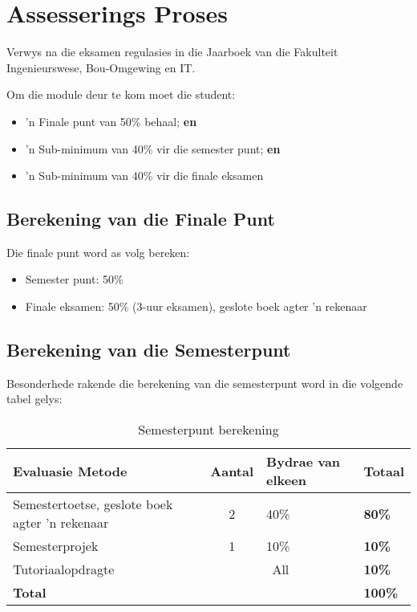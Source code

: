 \section{Assesserings Proses}
Verwys na die eksamen regulasies in die Jaarboek van die Fakulteit
Ingenieurswese, Bou-Omgewing en IT.

Om die module deur te kom moet die student:
    \begin{itemize}
        \item 'n Finale punt van 50\% behaal; {\bf en}
        \item 'n Sub-minimum van 40\% vir die semester punt; {\bf en}
        \item 'n Sub-minimum van 40\% vir die finale eksamen
    \end{itemize}
    
    \subsection{Berekening van die Finale Punt}
        Die finale punt word as volg bereken:
        \begin{itemize}
            \item Semester punt: 50\%
            \item Finale eksamen: 50\% (3-uur eksamen), geslote boek
              agter 'n rekenaar
        \end{itemize}

    \subsection{Berekening van die Semesterpunt}
    Besonderhede rakende die berekening van die semesterpunt word in
    die volgende tabel gelys:
        \begin{table}[!h]
            \begin{center}
             \begin{tabular}{|p{5cm}|c|l|l|}
               \hline
               {\bf Evaluasie Metode} & {\bf Aantal} & 
               {\bf Bydrae van elkeen} & {\bf Totaal} \\
               \hline
               Semestertoetse, geslote boek
               agter 'n rekenaar
               & 2 & 40\% & {\bf 80\%} \\ \hline
               Semesterprojek
               & 1 & 10\% & {\bf 10\%} \\ \hline
               Tutoriaalopdragte
               & \multicolumn{2}{|c|}{All} & {\bf 10\%} \\
               \hline
               \multicolumn{3}{|l|}{{\bf Total}} & {\bf 100\%} \\
               \hline
             \end{tabular}
             \caption{Semesterpunt berekening}
            \end{center}
        \end{table}
    

